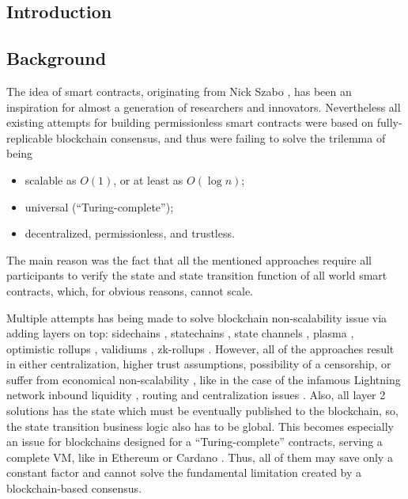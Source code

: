 \documentclass[9pt,oneside]{amsart}
\begin{document}
\thispagestyle{empty}
\setlength{\columnsep}{20pt}
\begin{multicols}{2}

\section{Introduction}

\subsection{Background}

The idea of smart contracts, originating from Nick Szabo \cite{Szabo},
has been an inspiration for almost a generation of researchers and innovators.
Nevertheless all existing attempts for building permissionless smart contracts
were based on fully-replicable blockchain consensus,
and thus were failing to solve the trilemma of being
\begin{itemize}
    \item scalable as $O(1)$, or at least as $O(\log n)$;
    \item universal (``Turing-complete'');
    \item decentralized, permissionless, and trustless.
\end{itemize}

The main reason was the fact that all the mentioned approaches require
all participants to verify the state and state transition function of all world smart contracts,
which, for obvious reasons, cannot scale.

Multiple attempts has being made to solve blockchain non-scalability issue
via adding layers on top: sidechains \cite{sidechains, drivechains},
statechains \cite{statechains}, state channels \cite{lightning, eltoo}, plasma \cite{plasma},
optimistic rollups \cite{optimism}, validiums \cite{validium},
zk-rollups \cite{zk-rollups, Cairo, mina}.
However, all of the approaches result in either
centralization, higher trust assumptions, possibility of a censorship,
or suffer from economical non-scalability \cite{drivechainsucks, plasmasucks, rollupsucks},
like in the case of the infamous Lightning network inbound liquidity \cite{lightningsucks1, lightningsucks4},
routing \cite{lightningsucks2} and centralization issues \cite{lightningsucks3, lightningsucks5}.
Also, all layer 2 solutions has the state which must be eventually published
to the blockchain, so, the state transition business logic also has to be global.
This becomes especially an issue for blockchains designed for a
``Turing-complete'' contracts, serving a complete VM,
like in Ethereum \cite{ethereum} or Cardano \cite{cardano}.
Thus, all of them may save only a constant factor and cannot solve the fundamental
limitation created by a blockchain-based consensus.


\end{multicols}
\end{document}
